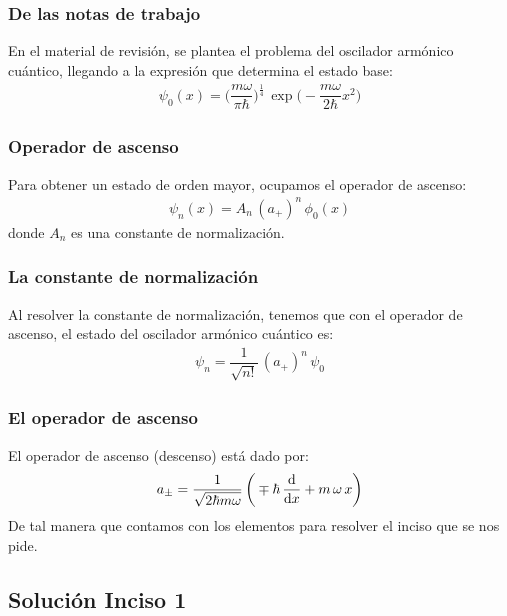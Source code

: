 \documentclass[12pt]{beamer}
\begin{document}
\begin{frame}
\frametitle{De las notas de trabajo}
En el material de revisión, se plantea el problema del oscilador armónico cuántico, llegando a la expresión que determina el estado base:
\begin{align*}
\psi_{0} (x) = \bigg( \dfrac{m \omega}{\pi \hbar} \bigg)^{\frac{1}{4}} \, \exp\bigg(- \dfrac{m \omega}{2 \hbar} x^{2} \bigg)
\end{align*}
\end{frame}
\begin{frame}
\frametitle{Operador de ascenso}
Para obtener un estado de orden mayor, ocupamos el operador de ascenso:
\pause
\begin{align*}
\psi_{n} (x) = A_{n} \, (a_{+})^{n} \, \phi_{0} (x)
\end{align*}
donde $A_{n}$ es una constante de normalización.
\end{frame}
\begin{frame}
\frametitle{La constante de normalización}
Al resolver la constante de normalización, tenemos que con el operador de ascenso, el estado del oscilador armónico cuántico es:
\pause
\begin{align*}
\psi_{n} = \dfrac{1}{\sqrt{n!}} \, (a_{+})^{n} \, \psi_{0}
\end{align*}
\end{frame}
\begin{frame}
\frametitle{El operador de ascenso}
El operador de ascenso (descenso) está dado por:
\pause
\begin{align*}
a_{\pm} = \dfrac{1}{\sqrt{2 \hbar m \omega}} \, \bigg( \mp \hbar \, \dv{x} + m \, \omega \, x \bigg)
\end{align*}
\pause
De tal manera que contamos con los elementos para resolver el inciso que se nos pide.
\end{frame}

\subsection{Solución Inciso 1}
\end{document}
